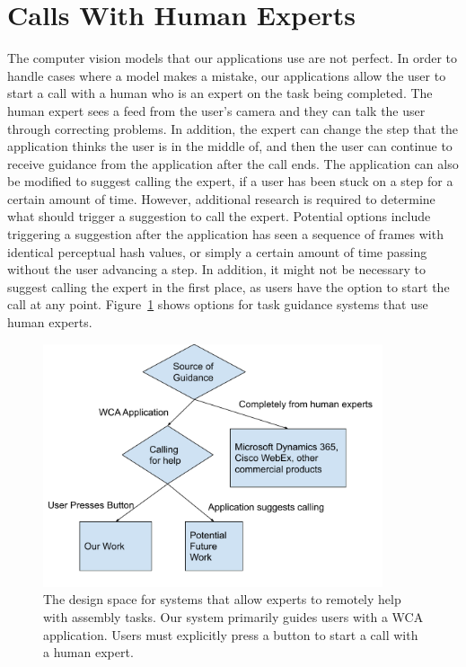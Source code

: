 \section{Calls With Human Experts}

The computer vision models that our applications use are not perfect. In order
to handle cases where a model makes a mistake, our applications allow the user
to start a call with a human who is an expert on the task being completed. The
human expert sees a feed from the user's camera and they can talk the user
through correcting problems. In addition, the expert can change the step that
the application thinks the user is in the middle of, and then the user can
continue to receive guidance from the application after the call ends.
The application can also be modified to suggest calling the expert, if a user
has been stuck on a step for a certain amount of time.
However, additional research is required to determine what should trigger a
suggestion to call the expert.
Potential options include triggering a suggestion after the application has seen
a sequence of frames with identical perceptual hash
values, or simply a certain amount of time passing without the user advancing a
step.
In addition, it might not be necessary to suggest calling the expert in the
first place, as users have the option to start the call at any point.
Figure~\ref{fig:design_space} shows options for task guidance systems that use
human experts.

\begin{figure}[h]
  \includegraphics[width=10cm]{figures/design_space.pdf}
  \caption{The design space for systems that allow experts to remotely help with
    assembly tasks.
    Our system primarily guides users with a WCA application.
    Users must explicitly press a button to start a call with a human expert.
  }\label{fig:design_space}
\end{figure}

